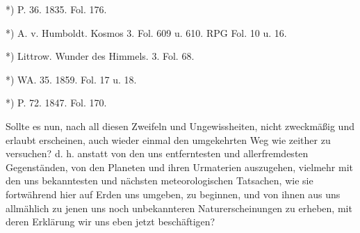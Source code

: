 \documentclass[a4paper, 8pt, oneside, polutonikogreek, german]{article}
\begin{document}
*) P. 36. 1835. Fol. 176.

*) A. v. Humboldt. Kosmos 3. Fol. 609 u. 610. RPG Fol. 10 u. 16.

*) Littrow. Wunder des Himmels. 3. Fol. 68.

*) WA. 35. 1859. Fol. 17 u. 18.

*) P. 72. 1847. Fol. 170.

Sollte es nun, nach all diesen Zweifeln und Ungewissheiten, nicht zweckmäßig und erlaubt erscheinen, auch wieder einmal den umgekehrten Weg wie zeither zu versuchen? d. h. anstatt von den uns entferntesten und allerfremdesten Gegenständen, von den Planeten und ihren Urmaterien auszugehen, vielmehr mit den uns bekanntesten und nächsten meteorologischen Tatsachen, wie sie fortwährend hier auf Erden uns umgeben, zu beginnen, und von ihnen aus uns allmählich zu jenen uns noch unbekannteren Naturerscheinungen zu erheben, mit deren Erklärung wir uns eben jetzt beschäftigen?
\end{document}
